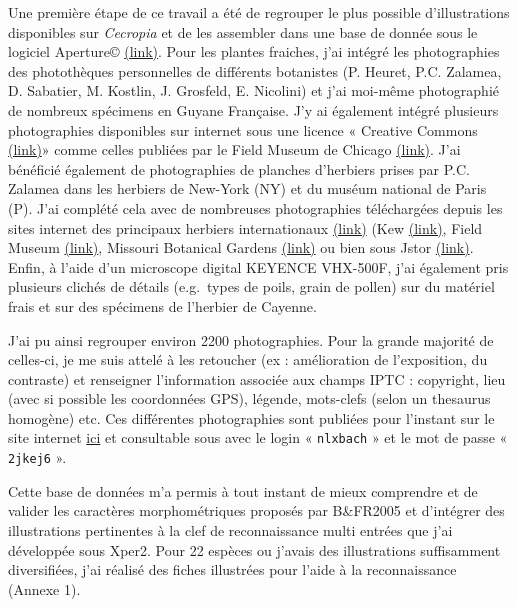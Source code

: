 \documentclass[a4paper]{article}
\theoremstyle{definition}
\theoremstyle{definition}
\theoremstyle{definition}
\theoremstyle{remark}
\begin{document}
Une première étape de ce travail a été de regrouper le plus possible
d'illustrations disponibles sur \emph{Cecropia} et de les assembler dans
une base de donnée sous le logiciel Aperture©
\href{http://www.apple.com/fr/aperture/}{(link)}. Pour les plantes
fraiches, j'ai intégré les photographies des photothèques personnelles
de différents botanistes (P. Heuret, P.C. Zalamea, D. Sabatier, M.
Kostlin, J. Grosfeld, E. Nicolini) et j'ai moi-même photographié de
nombreux spécimens en Guyane Française. J'y ai également intégré
plusieurs photographies disponibles sur internet sous une licence «
Creative Commons
\href{http://fr.wikipedia.org/wiki/Creative_Commons}{(link)}» comme
celles publiées par le Field Museum de Chicago
\href{http://fm2.fieldmuseum.org/plantguides/results.asp?genus=Cecropia}{(link)}.
J'ai bénéficié également de photographies de planches d'herbiers prises
par P.C. Zalamea dans les herbiers de New-York (NY) et du muséum
national de Paris (P). J'ai complété cela avec de nombreuses
photographies téléchargées depuis les sites internet des principaux
herbiers internationaux
\href{http://en.wikipedia.org/wiki/Virtual_herbarium}{(link)} (Kew
\href{http://apps.kew.org/herbcat/navigator.do}{(link)}, Field Museum
\href{http://fm1.fieldmuseum.org/vrrc/}{(link)}, Missouri Botanical
Gardens \href{http://www.tropicos.org/ImageSearch.aspx}{(link)} ou bien
sous Jstor \href{http://plants.jstor.org/}{(link)}. Enfin, à l'aide d'un
microscope digital KEYENCE VHX-500F, j'ai également pris plusieurs
clichés de détails (e.g.~types de poils, grain de pollen) sur du
matériel frais et sur des spécimens de l'herbier de Cayenne.

J'ai pu ainsi regrouper environ 2200 photographies. Pour la grande
majorité de celles-ci, je me suis attelé à les retoucher (ex :
amélioration de l'exposition, du contraste) et renseigner l'information
associée aux champs IPTC : copyright, lieu (avec si possible les
coordonnées GPS), légende, mots-clefs (selon un thesaurus homogène) etc.
Ces différentes photographies sont publiées pour l'instant sur le site
internet \href{http://joomeo.com/patrick.heuret}{ici} et consultable
sous avec le login « \texttt{nlxbach} » et le mot de passe «
\texttt{2jkej6} ».

Cette base de données m'a permis à tout instant de mieux comprendre et
de valider les caractères morphométriques proposés par B\&FR2005 et
d'intégrer des illustrations pertinentes à la clef de reconnaissance
multi entrées que j'ai développée sous Xper2. Pour 22 espèces ou j'avais
des illustrations suffisamment diversifiées, j'ai réalisé des fiches
illustrées pour l'aide à la reconnaissance (Annexe 1).
\end{document}
